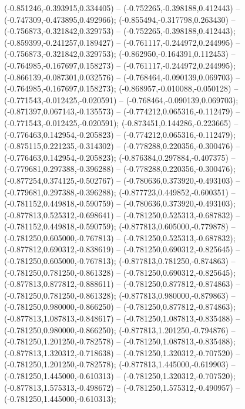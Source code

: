  (-0.851246,-0.393915,0.334405) -- (-0.752265,-0.398188,0.412443) -- (-0.747309,-0.473895,0.492966);
 (-0.855494,-0.317798,0.263430) -- (-0.756873,-0.321842,0.329753) -- (-0.752265,-0.398188,0.412443);
 (-0.859399,-0.241257,0.189427) -- (-0.761117,-0.244972,0.244995) -- (-0.756873,-0.321842,0.329753);
 (-0.862950,-0.164391,0.112453) -- (-0.764985,-0.167697,0.158273) -- (-0.761117,-0.244972,0.244995);
 (-0.866139,-0.087301,0.032576) -- (-0.768464,-0.090139,0.069703) -- (-0.764985,-0.167697,0.158273);
 (-0.868957,-0.010088,-0.050128) -- (-0.771543,-0.012425,-0.020591) -- (-0.768464,-0.090139,0.069703);
 (-0.871397,0.067143,-0.135573) -- (-0.774212,0.065316,-0.112479) -- (-0.771543,-0.012425,-0.020591);
 (-0.873451,0.144286,-0.223665) -- (-0.776463,0.142954,-0.205823) -- (-0.774212,0.065316,-0.112479);
 (-0.875115,0.221235,-0.314302) -- (-0.778288,0.220356,-0.300476) -- (-0.776463,0.142954,-0.205823);
 (-0.876384,0.297884,-0.407375) -- (-0.779681,0.297388,-0.396288) -- (-0.778288,0.220356,-0.300476);
 (-0.877254,0.374125,-0.502767) -- (-0.780636,0.373920,-0.493103) -- (-0.779681,0.297388,-0.396288);
 (-0.877723,0.449852,-0.600351) -- (-0.781152,0.449818,-0.590759) -- (-0.780636,0.373920,-0.493103);
 (-0.877813,0.525312,-0.698641) -- (-0.781250,0.525313,-0.687832) -- (-0.781152,0.449818,-0.590759);
 (-0.877813,0.605000,-0.779878) -- (-0.781250,0.605000,-0.767813) -- (-0.781250,0.525313,-0.687832);
 (-0.877812,0.690312,-0.838619) -- (-0.781250,0.690312,-0.825645) -- (-0.781250,0.605000,-0.767813);
 (-0.877813,0.781250,-0.874863) -- (-0.781250,0.781250,-0.861328) -- (-0.781250,0.690312,-0.825645);
 (-0.877813,0.877812,-0.888611) -- (-0.781250,0.877812,-0.874863) -- (-0.781250,0.781250,-0.861328);
 (-0.877813,0.980000,-0.879863) -- (-0.781250,0.980000,-0.866250) -- (-0.781250,0.877812,-0.874863);
 (-0.877813,1.087813,-0.848617) -- (-0.781250,1.087813,-0.835488) -- (-0.781250,0.980000,-0.866250);
 (-0.877813,1.201250,-0.794876) -- (-0.781250,1.201250,-0.782578) -- (-0.781250,1.087813,-0.835488);
 (-0.877813,1.320312,-0.718638) -- (-0.781250,1.320312,-0.707520) -- (-0.781250,1.201250,-0.782578);
 (-0.877813,1.445000,-0.619903) -- (-0.781250,1.445000,-0.610313) -- (-0.781250,1.320312,-0.707520);
 (-0.877813,1.575313,-0.498672) -- (-0.781250,1.575312,-0.490957) -- (-0.781250,1.445000,-0.610313);
